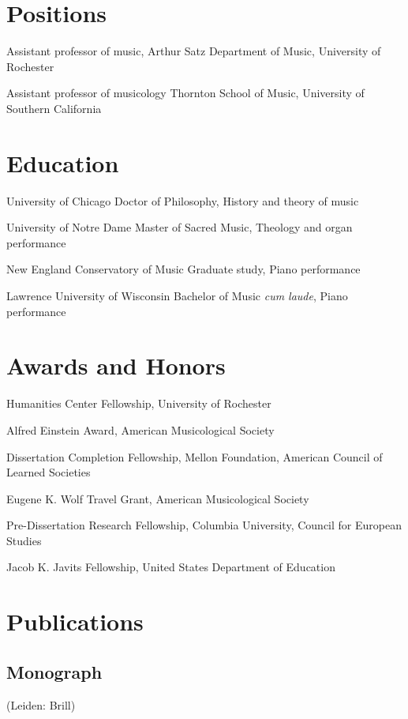 \documentclass{article}
\begin{document}
\section{Positions}
{Assistant professor of music,
Arthur Satz Department of Music, University of Rochester}

{Assistant professor of musicology
Thornton School of Music, University of Southern California}

\section{Education}
{University of Chicago
Doctor of Philosophy, History and theory of music}

{University of Notre Dame
Master of Sacred Music, Theology and organ performance}

{New England Conservatory of Music
Graduate study, Piano performance}

{Lawrence University of Wisconsin
Bachelor of Music \emph{cum laude}, Piano performance}

\section{Awards and Honors}
{Humanities Center Fellowship, University of Rochester}

{Alfred Einstein Award, American Musicological Society}

{Dissertation Completion Fellowship, Mellon Foundation, American Council of
Learned Societies}

{Eugene K. Wolf Travel Grant, American Musicological Society}

{Pre-Dissertation Research Fellowship, Columbia University, Council for
European Studies}

{Jacob K. Javits Fellowship, United States Department of Education}

\section{Publications}
\subsection{Monograph}
{ (Leiden:
Brill)}
\end{document}
